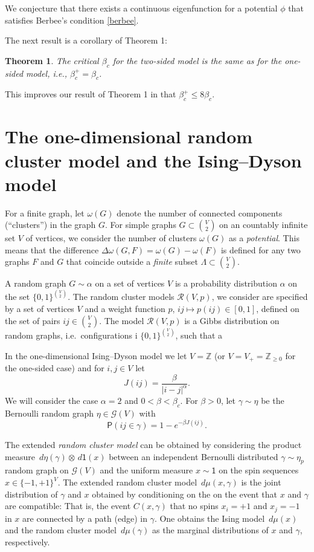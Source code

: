 \documentclass[11pt, a4paper]{amsart}
\newtheorem{thm}{Theorem}
\theoremstyle{definition}
\theoremstyle{remark}
\renewcommand{\d}{\,d}
\providecommand{\ZZ}{\mathbb{Z}}
\providecommand{\mscr}{\mathscr}
\renewcommand{\P}{\mathsf{P}}
\providecommand{\ett}{\mathsf{1}}
\providecommand{\g}{\gamma}
\providecommand{\w}{\omega}
\begin{document}
We conjecture that there exists a continuous eigenfunction for a potential
$\phi$ that satisfies Berbee's condition \eqref{berbee}.

The next result is a corollary of Theorem 1:

\begin{thm}
The critical $\beta_c$ for the two-sided model is the same as for the one-sided model, i.e., 
$\beta_c^+=\beta_c$.
\end{thm}

This improves our result of Theorem 1 in \cite{johob4} that $\beta_c^+\leq 8\beta_c$.
\section{The one-dimensional random cluster model and the Ising--Dyson model}

For a finite graph, let $\w(G)$ denote the number of connected components
(``clusters'') in the graph $G$. For simple graphs $G\subset \binom V2$ on an
countably infinite set $V$ of vertices, we consider the number of clusters
$\w(G)$ as a \emph{potential}. This means that the difference
$\Delta\w(G,F) = \w(G)-\w(F)$ is defined for any two graphs $F$ and $G$ that
coincide outside a \emph{finite} subset $\Lambda\subset \binom V2$.

A random graph $G\sim\alpha$ on a set of vertices $V$ is a probability
distribution $\alpha$ on the set $\{0,1\}^{\binom V2}$. The random cluster
models $\mscr R(V,p)$, we consider are specified by a set of vertices $V$ and a
weight function $p$, $ij\mapsto p(ij)\in[0,1]$, defined on the set of pairs
$ij\in \binom V2$. The model $\mscr R(V,p)$ is a Gibbs distribution on random
graphs, i.e.\ configurations i $\{0,1\}^{\binom V2}$, such that a

In the one-dimensional Ising--Dyson model we let $V=\ZZ$ (or $V=V_+=\ZZ_{\ge0}$ for
the one-sided case) and for $i,j\in V$ let
\begin{equation}\label{eq:Jdef}
  J({ij}) = \frac \beta{|i-j|^\alpha}.
\end{equation}
We will consider the case $\alpha=2$ and $0<\beta <\beta_c$. For $\beta>0$, let
\(\g\sim \eta \) be the Bernoulli random graph $\eta \in \mscr G(V)$ with
$$
\P(ij \in \g)=1-e^{-\beta J({ij})}.
$$

The extended \emph{random cluster model} can be obtained by considering the
product measure $\d\eta(\g) \otimes \d\ett(x)$ between an independent
Bernoulli distributed $\g\sim\eta_p$ random graph on $\mscr G(V)$ and the
uniform measure $x\sim\ett$ on the spin sequences $x\in\{-1,+1\}^{V}$. The
extended random cluster model $\d\mu(x,\g)$ is the joint distribution of $\g$
and $x$ obtained by conditioning on the on the event that $x$ and $\g$ are
compatible: That is, the event $C(x,\g)$ that no spins $x_i=+1$ and $x_j=-1$ in
$x$ are connected by a path (edge) in $\g$. One obtains the
Ising model $\d\mu(x)$ and the random cluster model $\d\mu(\g)$ as the marginal
distributions of $x$ and $\g$, respectively.
\end{document}
